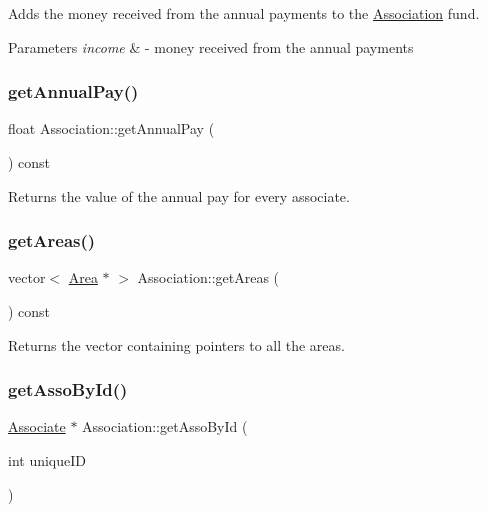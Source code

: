 Adds the money received from the annual payments to the \mbox{\hyperlink{classAssociation}{Association}} fund. 


\begin{DoxyParams}{Parameters}
{\em income} & -\/ money received from the annual payments \\
\hline
\end{DoxyParams}
\mbox{\label{classAssociation_aa3bd82b207ae1ac0e44df1b481d4a8a1}} 
\subsubsection{\texorpdfstring{get\+Annual\+Pay()}{getAnnualPay()}}
{\footnotesize\ttfamily float Association\+::get\+Annual\+Pay (\begin{DoxyParamCaption}{ }\end{DoxyParamCaption}) const}



Returns the value of the annual pay for every associate. 

\mbox{\label{classAssociation_a46f83e00e0201f25129a5c8167969661}} 
\subsubsection{\texorpdfstring{get\+Areas()}{getAreas()}}
{\footnotesize\ttfamily vector$<$ \mbox{\hyperlink{classArea}{Area}} $\ast$ $>$ Association\+::get\+Areas (\begin{DoxyParamCaption}{ }\end{DoxyParamCaption}) const}



Returns the vector containing pointers to all the areas. 

\mbox{\label{classAssociation_a0c9670f1508da038f12e4ed11042189e}} 
\subsubsection{\texorpdfstring{get\+Asso\+By\+Id()}{getAssoById()}}
{\footnotesize\ttfamily \mbox{\hyperlink{classAssociate}{Associate}} $\ast$ Association\+::get\+Asso\+By\+Id (\begin{DoxyParamCaption}\item[{int}]{unique\+ID }\end{DoxyParamCaption})}



